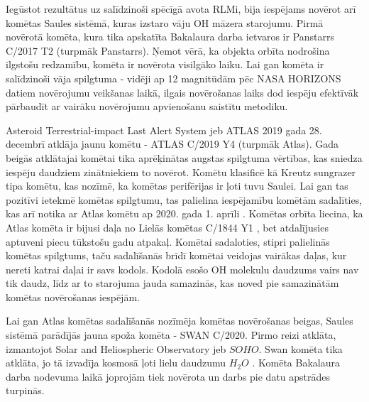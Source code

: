 Iegūstot rezultātus uz salīdzinoši spēcīgā avota RLMi, bija iespējams novērot arī komētas Saules sistēmā, kuras izstaro vāju OH māzera starojumu. Pirmā novērotā komēta, kura tika apskatīta Bakalaura darba ietvaros ir Panstarrs C/2017 T2 (turpmāk Panstarrs). Ņemot vērā, ka objekta orbīta nodrošina ilgstošu redzamību, komēta ir novērota visilgāko laiku. Lai gan komēta ir salīdzinoši vāja spilgtuma - vidēji ap 12 magnitūdām pēc NASA HORIZONS datiem novērojumu veikšanas laikā, ilgais novērošanas laiks dod iespēju efektīvāk pārbaudīt ar vairāku novērojumu apvienošanu saistītu metodiku.

Asteroid Terrestrial-impact Last Alert System jeb ATLAS 2019 gada 28. decembrī atklāja jaunu komētu - ATLAS C/2019 Y4 (turpmāk Atlas). Gada beigās atklātajai komētai tika aprēķinātas augstas spilgtuma vērtības, kas sniedza iespēju daudziem zinātniekiem to novērot. Komētu klasificē kā Kreutz sungrazer tipa komētu, kas nozīmē, ka komētas perifērijas ir ļoti tuvu Saulei. Lai gan tas pozitīvi ietekmē komētas spilgtumu, tas palielina iespējamību komētām sadalīties, kas arī notika ar Atlas komētu ap 2020. gada 1. aprīli \cite{atlas-frag}.   Komētas orbīta liecina, ka Atlas komēta ir bijusi daļa no Lielās komētas C/1844 Y1 \cite{atlas-article}, bet atdalījusies aptuveni piecu tūkstošu gadu atpakaļ. Komētai sadaloties, stipri palielinās komētas spilgtums, taču sadalīšanās brīdī komētai veidojas vairākas daļas, kur nereti katrai daļai ir savs kodols. Kodolā esošo OH molekulu daudzums vairs nav tik daudz, līdz ar to starojuma jauda samazinās, kas noved pie samazinātām komētas novērošanas iespējām.

Lai gan Atlas komētas sadalīšanās nozīmēja komētas novērošanas beigas, Saules sistēmā parādījās jauna spoža komēta - SWAN C/2020. Pirmo reizi atklāta, izmantojot Solar and Heliospheric Observatory jeb $SOHO$. Swan komēta tika atklāta, jo tā izvadīja kosmosā ļoti lielu daudzumu $H_2O$ \cite{swan-disc}. Komēta Bakalaura darba nodevuma laikā joprojām tiek novērota un darbs pie datu apstrādes turpinās.

